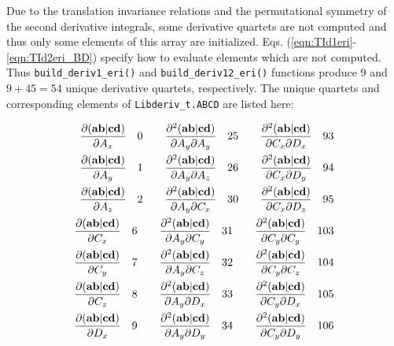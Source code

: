 \documentclass[12pt]{article}
\begin{document}
Due to the translation invariance relations and the permutational symmetry of the second derivative integrals,
some derivative quartets are not computed and thus
only some elements of this array are initialized. Eqs. (\ref{eqn:TId1eri}-\ref{eqn:TId2eri_BD})
specify how to evaluate elements which are not computed. Thus {\tt build\_deriv1\_eri()} and {\tt build\_deriv12\_eri()}
functions produce 9 and $9+45=54$ unique derivative quartets, respectively. The unique quartets and corresponding
elements of {\tt Libderiv\_t.ABCD} are listed here:
\begin{scriptsize}
\begin{eqnarray}
\frac{\partial ({\bf ab}|{\bf cd})}{\partial A_x} \quad 0 \quad \quad \frac{\partial^2 ({\bf ab}|{\bf cd})}{\partial A_y \partial A_y} \quad 25 \quad \quad 
\frac{\partial^2 ({\bf ab}|{\bf cd})}{\partial C_x \partial D_x} \quad 93 \nonumber \\
\frac{\partial ({\bf ab}|{\bf cd})}{\partial A_y} \quad 1 \quad \quad \frac{\partial^2 ({\bf ab}|{\bf cd})}{\partial A_y \partial A_z} \quad 26 \quad \quad 
\frac{\partial^2 ({\bf ab}|{\bf cd})}{\partial C_x \partial D_y} \quad 94 \nonumber \\
\frac{\partial ({\bf ab}|{\bf cd})}{\partial A_z} \quad 2 \quad \quad \frac{\partial^2 ({\bf ab}|{\bf cd})}{\partial A_y \partial C_x} \quad 30 \quad \quad 
\frac{\partial^2 ({\bf ab}|{\bf cd})}{\partial C_x \partial D_z} \quad 95 \nonumber \\
\frac{\partial ({\bf ab}|{\bf cd})}{\partial C_x} \quad 6 \quad \quad \frac{\partial^2 ({\bf ab}|{\bf cd})}{\partial A_y \partial C_y} \quad 31 \quad \quad 
\frac{\partial^2 ({\bf ab}|{\bf cd})}{\partial C_y \partial C_y} \quad 103 \nonumber \\
\frac{\partial ({\bf ab}|{\bf cd})}{\partial C_y} \quad 7 \quad \quad \frac{\partial^2 ({\bf ab}|{\bf cd})}{\partial A_y \partial C_z} \quad 32 \quad \quad 
\frac{\partial^2 ({\bf ab}|{\bf cd})}{\partial C_y \partial C_z} \quad 104 \nonumber \\
\frac{\partial ({\bf ab}|{\bf cd})}{\partial C_z} \quad 8 \quad \quad \frac{\partial^2 ({\bf ab}|{\bf cd})}{\partial A_y \partial D_x} \quad 33 \quad \quad 
\frac{\partial^2 ({\bf ab}|{\bf cd})}{\partial C_y \partial D_x} \quad 105 \nonumber \\
\frac{\partial ({\bf ab}|{\bf cd})}{\partial D_x} \quad 9 \quad \quad \frac{\partial^2 ({\bf ab}|{\bf cd})}{\partial A_y \partial D_y} \quad 34 \quad \quad 
\frac{\partial^2 ({\bf ab}|{\bf cd})}{\partial C_y \partial D_y} \quad 106 \nonumber \\

\end{eqnarray}
\end{scriptsize}
\end{document}
